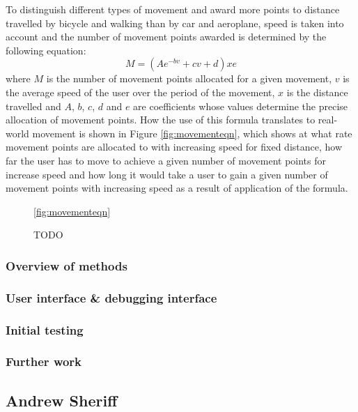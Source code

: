 \documentclass[12pt,a4paper,twoside]{article}
\begin{document}
To distinguish different types of movement and award more points to distance travelled by bicycle and walking than by car and aeroplane, speed is taken into account and the number of movement points awarded is determined by the following equation:
\begin{equation}
M = \left({Ae^{-bv}+cv+d}\right)xe
\end{equation}
where $M$ is the number of movement points allocated for a given movement, $v$ is the average speed of the user over the period of the movement, $x$ is the distance travelled and $A$, $b$, $c$, $d$ and $e$ are coefficients whose values determine the precise allocation of movement points. How the use of this formula translates to real-world movement is shown in Figure \ref{fig:movementeqn}, which shows at what rate movement points are allocated to with increasing speed for fixed distance, how far the user has to move to achieve a given number of movement points for increase speed and how long it would take a user to gain a given number of movement points with increasing speed as a result of application of the formula.

\begin{figure}
\ref{fig:movementeqn}

\caption{TODO}
\end{figure}

\subsubsection{Overview of methods}

\subsubsection{User interface \& debugging interface}

\subsubsection{Initial testing}

\subsubsection{Further work}



\subsection{Andrew Sheriff}
\end{document}
